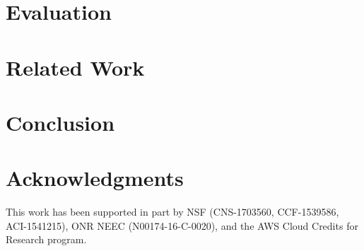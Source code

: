 \documentclass[10pt, conference, compsocconf]{IEEEtran}
\begin{document}
\section{Evaluation}
\label{sec:eval}


\section{Related Work}
\label{sec:relate_work}



\section{Conclusion}
\label{sec:conclusion}



\section*{Acknowledgments}
This work has been supported in part by NSF (CNS-1703560, CCF-1539586,
ACI-1541215), ONR NEEC (N00174-16-C-0020),
and the AWS Cloud Credits for Research program.




\end{document}
